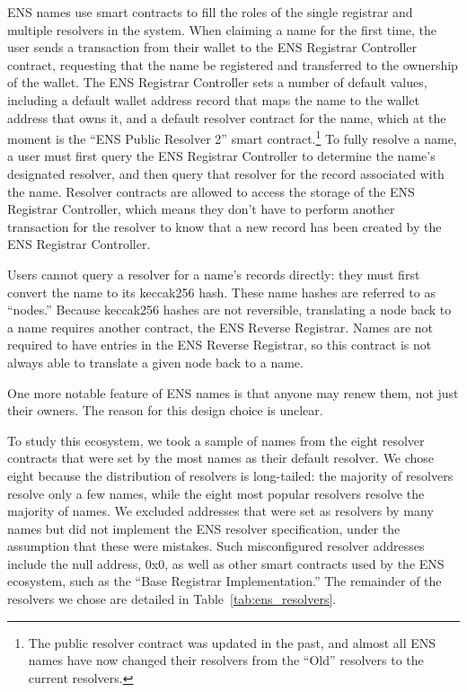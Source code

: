 \documentclass[conference]{IEEEtran}
\begin{document}
ENS names use smart contracts to fill the roles of the single registrar and 
multiple resolvers in the system. When claiming a name for the first 
time, the user sends a transaction from their wallet to the ENS Registrar 
Controller 
contract, requesting that the name be registered and transferred to the 
ownership of the wallet. The ENS Registrar Controller sets a number of default 
values, including a default wallet 
address record that maps the name to the wallet address that owns it, and a 
default resolver contract for the 
name, which at the moment is the ``ENS Public Resolver 2'' smart 
contract.\footnote{The public 
resolver contract was updated in the past, and almost all ENS names have now 
changed their resolvers 
from the ``Old'' resolvers to the current resolvers.} To fully 
resolve a 
name, a user must first query the ENS Registrar Controller to determine the 
name's designated resolver, and then query that resolver for the record 
associated with the name. Resolver contracts are allowed to access the storage 
of the ENS Registrar Controller, which means they don't have to perform another 
transaction for the resolver to know that a new record has been created by the 
ENS Registrar Controller. 

Users cannot query a resolver for a name's records directly: they must first 
convert the name to its keccak256 hash. These 
name hashes are referred to as ``nodes.'' Because keccak256 hashes are not 
reversible, 
translating a node back to a name requires another contract, the ENS Reverse 
Registrar. Names are not required to have entries in the ENS Reverse Registrar, 
so this contract is not always able to translate a given node 
back to a name. 

One more notable feature of ENS names is that anyone may renew 
them, not just their owners. The reason for this design choice 
is unclear.

To study this ecosystem, we took a sample of names from the eight resolver 
contracts that were set by the most names as their default resolver. We chose 
eight because the distribution of resolvers is long-tailed: the majority of 
resolvers resolve only a few names, while the eight most popular resolvers 
resolve the majority of names. We excluded addresses that were set as resolvers 
by many names but did not implement the ENS resolver specification, under the 
assumption that these were mistakes. Such misconfigured resolver addresses 
include the null address, 
0x0, as well as other smart contracts used by the ENS ecosystem, such as the 
``Base Registrar Implementation.''  The remainder of the resolvers we chose are 
detailed in Table~\ref{tab:ens_resolvers}.
\end{document}
